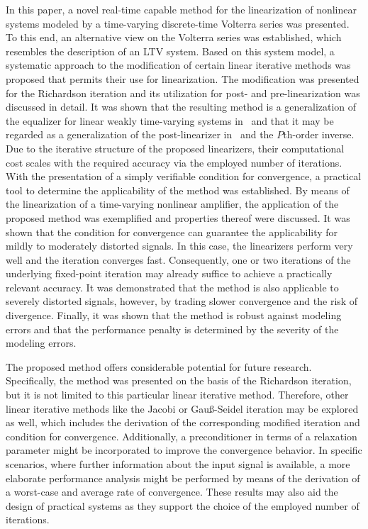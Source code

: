 \documentclass[10pt,twocolumn,twoside]{IEEEtran}
\begin{document}
In this paper, a novel real-time capable method for the linearization of nonlinear systems
modeled by a time-varying discrete-time Volterra series was presented.
To this end, an alternative view on the Volterra series was established,
which resembles the description of an LTV system. Based on this system model,
a systematic approach to the modification of certain linear iterative methods was
proposed that permits their use for linearization. The modification was
presented for the Richardson iteration and its
utilization for post- and pre-linearization was discussed in detail.
It was shown that the resulting method is a generalization of the equalizer for
linear weakly time-varying systems in~\cite{soudan2012} and that it may
be regarded as a generalization of the post-linearizer in~\cite{nowak1997}
and the $P$th-order inverse.
Due to the iterative structure of the proposed linearizers, their computational cost
scales with the required accuracy via the employed number of iterations.
With the presentation of a simply verifiable
condition for convergence, a practical tool to determine the applicability
of the method was established. By means of the linearization of a time-varying
nonlinear amplifier, the application of the proposed method was exemplified
and properties thereof were discussed. It was shown that the condition for
convergence can guarantee the applicability for mildly to moderately
distorted signals. In this case, the linearizers perform very well and the
iteration converges fast. Consequently, one or two iterations of the
underlying fixed-point iteration may already suffice to achieve a
practically relevant accuracy. It was demonstrated that the
method is also applicable to severely distorted signals, however,
by trading slower convergence and the risk of divergence.
Finally, it was shown that the method
is robust against modeling errors and that the performance penalty
is determined by the severity of the modeling errors.

The proposed method offers considerable potential for future research. Specifically,
the method was presented on the basis of the Richardson iteration, but it is
not limited to this particular linear iterative method. Therefore, other linear
iterative methods like the Jacobi or Gau\ss-Seidel iteration may be explored as
well, which includes the derivation of the corresponding modified iteration and
condition for convergence. Additionally, a preconditioner in terms of a
relaxation parameter might be incorporated to improve the convergence behavior.
In specific scenarios, where further information about the input
signal is available, a more elaborate performance analysis might be performed
by means of the derivation of a worst-case and average rate of convergence.
These results may also aid the design of practical systems as they support
the choice of the employed number of iterations.
\end{document}
